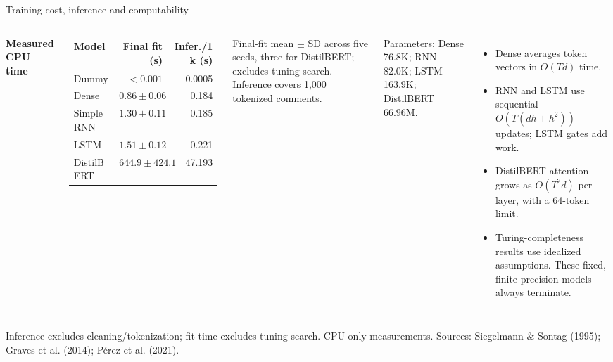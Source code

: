 \documentclass[aspectratio=169,10pt]{beamer}
\begin{document}
\begin{frame}{Training cost, inference and computability}
\begin{columns}[T,onlytextwidth]
    \textbf{Measured CPU time}\par\vspace{0.1cm}
    {\scriptsize
    \begin{tabular}{@{}lrr@{}}
      \toprule
      Model & Final fit (s) & Infer./1k (s) \\
      \midrule
      Dummy & $<0.001$ & 0.0005 \\
      Dense & $0.86\pm0.06$ & 0.184 \\
      SimpleRNN & $1.30\pm0.11$ & 0.185 \\
      LSTM & $1.51\pm0.12$ & 0.221 \\
      DistilBERT & $644.9\pm424.1$ & 47.193 \\
      \bottomrule
    \end{tabular}\par
    }\vspace{0.12cm}
    {\color{muted}\scriptsize Final-fit mean $\pm$ SD across five seeds, three for DistilBERT; excludes tuning search. Inference covers 1,000 tokenized comments.}\par
    \small Parameters: Dense 76.8K; RNN 82.0K; LSTM 163.9K; DistilBERT 66.96M.
    \begin{itemize}
      \item Dense averages token vectors in $O(Td)$ time.
      \item RNN and LSTM use sequential $O(T(dh+h^2))$ updates; LSTM gates add work.
      \item DistilBERT attention grows as $O(T^2d)$ per layer, with a 64-token limit.
      \item Turing-completeness results use idealized assumptions. These fixed, finite-precision models always terminate.
    \end{itemize}
\end{columns}
\vfill
{\color{muted}\scriptsize Inference excludes cleaning/tokenization; fit time excludes tuning search. CPU-only measurements. Sources: Siegelmann \& Sontag (1995); Graves et al. (2014); Pérez et al. (2021).}
\end{frame}
\end{document}
